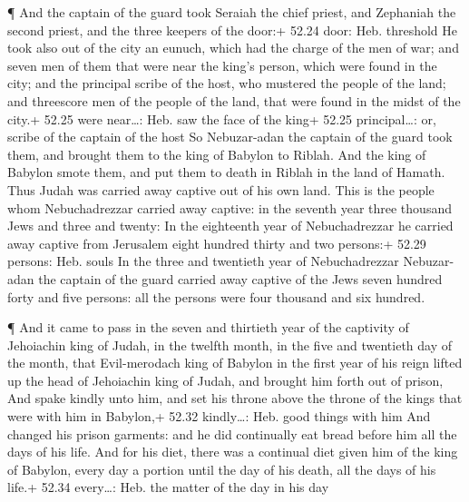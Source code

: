  ¶ And the captain of the guard took Seraiah the chief
priest, and Zephaniah the second priest, and the three keepers of the
door:+ 52.24 door: Heb. threshold  He took also out of the
city an eunuch, which had the charge of the men of war; and seven men of
them that were near the king's person, which were found in the city; and
the principal scribe of the host, who mustered the people of the land;
and threescore men of the people of the land, that were found in the
midst of the city.+ 52.25 were near\ldots: Heb. saw the face of the
king+ 52.25 principal\ldots: or, scribe of the captain of the host
 So Nebuzar-adan the captain of the guard took them, and
brought them to the king of Babylon to Riblah.  And the
king of Babylon smote them, and put them to death in Riblah in the land
of Hamath. Thus Judah was carried away captive out of his own land.
 This is the people whom Nebuchadrezzar carried away
captive: in the seventh year three thousand Jews and three and twenty:
 In the eighteenth year of Nebuchadrezzar he carried away
captive from Jerusalem eight hundred thirty and two persons:+ 52.29
persons: Heb. souls  In the three and twentieth year of
Nebuchadrezzar Nebuzar-adan the captain of the guard carried away
captive of the Jews seven hundred forty and five persons: all the
persons were four thousand and six hundred.

 ¶ And it came to pass in the seven and thirtieth year of
the captivity of Jehoiachin king of Judah, in the twelfth month, in the
five and twentieth day of the month, that Evil-merodach king of Babylon
in the first year of his reign lifted up the head of Jehoiachin king of
Judah, and brought him forth out of prison,  And spake
kindly unto him, and set his throne above the throne of the kings that
were with him in Babylon,+ 52.32 kindly\ldots: Heb. good things with him
 And changed his prison garments: and he did continually
eat bread before him all the days of his life.  And for his
diet, there was a continual diet given him of the king of Babylon, every
day a portion until the day of his death, all the days of his life.+
52.34 every\ldots: Heb. the matter of the day in his day
